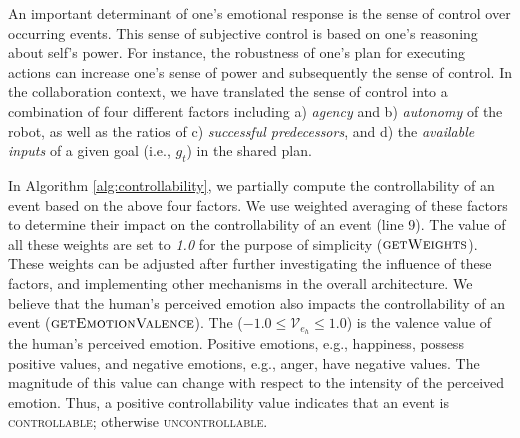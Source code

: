 \documentclass[12pt]{report}
\begin{document}
An important determinant of one's emotional response is the sense of control
over occurring events. This sense of subjective control is based on one's
reasoning about self's power. For instance, the robustness of one's plan for
executing actions can increase one's sense of power and subsequently the sense
of control. In the collaboration context, we have translated the sense of control
into a combination of four different factors including a) \textit{agency} and b)
\textit{autonomy} of the robot, as well as the ratios of c) \textit{successful
predecessors}, and d) the \textit{available inputs} of a given goal
(i.e., $\mathit{g}_{t}$) in the shared plan.

In Algorithm \ref{alg:controllability}, we partially compute the controllability
of an event based on the above four factors. We use weighted averaging of these
factors to determine their impact on the controllability of an event (line 9).
The value of all these weights are set to \textit{1.0} for the purpose of
simplicity (\textbf{$\Call{getWeights}{}$}). These weights can be adjusted after
further investigating the influence of these factors, and implementing other
mechanisms in the overall architecture. We believe that the human's perceived
emotion also impacts the controllability of an event
(\textbf{$\Call{getEmotionValence}{}$}). The ($-1.0 \leq \mathcal{V}_{e_h} \leq
1.0$) is the valence value of the human's perceived emotion. Positive emotions,
e.g., happiness, possess positive values, and negative emotions, e.g., anger,
have negative values. The magnitude of this value can change with respect to the
intensity of the perceived emotion. Thus, a positive controllability value
indicates that an event is \textsc{controllable}; otherwise
\textsc{uncontrollable}.

% 
\end{document}
